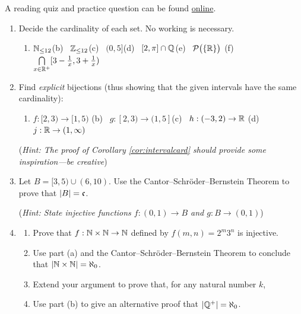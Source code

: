 \begin{exercises}{}{}
	A reading quiz and practice question can be found \href{http://www.math.uci.edu/~ndonalds/math13/selftest/8-2-uncountable.html}{online}.

	\begin{enumerate}
	  \item Decide the cardinality of each set. No working is necessary.
	  \begin{enumerate}
	    \item $\mathbb{N}_{\le 12}$\hfill (b) \ $\mathbb{Z}_{\le 12}$\hfill (c) \ $(0,5]$\hfill (d) \ $[2,\pi]\cap\mathbb{Q}$\hfill (e) \ $\mathcal{P}\bigl(\{\mathbb{R}\}\bigr)$ \hfill (f) \ $\bigcap\limits_{x\in\mathbb{R}^+}[3-\frac 1x,3+\frac 1x)$
	  \end{enumerate}
	  
	  
	  \item Find \emph{explicit} bijections (thus showing that the given intervals have the same cardinality):
	  \begin{enumerate}
	    \item $f:[2,3)\to [1,5)$ \qquad (b) \ $g:[2,3)\to (1,5]$\qquad (c) \ $h:(-3,2)\to\mathbb{R}$ \qquad (d) \ $j:\mathbb{R}\to(1,\infty)$
	  \end{enumerate}
	  (\emph{Hint: The proof of Corollary \ref{cor:intervalcard} should provide some inspiration---be creative}) 
  
  
  	\item Let $B=[3,5)\cup(6,10)$. Use the Cantor--Schröder--Bernstein Theorem to prove that $\left| B\right|=\mathfrak{c}$.\par
  	(\emph{Hint: State injective functions $f:(0,1)\to B$ and $g:B\to(0,1)$})
  	
  	
  	\goodbreak
  	
  	
  	\item\begin{enumerate}
  		\item Prove that $f:\mathbb{N}\times\mathbb{N}\to\mathbb{N}$ defined by $f(m,n)=2^m3^n$ is injective.
  		\item Use part (a) and the Cantor--Schröder--Bernstein Theorem to conclude that $\left| \mathbb{N}\times\mathbb{N}\right|=\aleph_0$.
  		\item Extend your argument to prove that, for any natural number $k$,	
  		\item Use part (b) to give an alternative proof that $\left| \mathbb{Q}^+\right|=\aleph_0$.
  	\end{enumerate}
  	

\end{enumerate}
\end{exercises}
